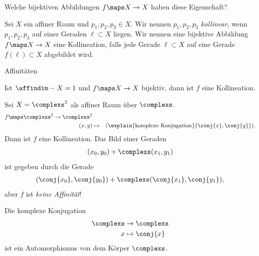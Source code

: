 \begin{frage*}
    Welche bijektiven Abbildungen \( f\maps X\to X \) haben diese Eigenschaft?
\end{frage*}
\begin{definition*}
    Sei \( X \) ein affiner Raum und \( p_1,p_2,p_3\in X \). Wir nennen \( p_1,p_2,p_3 \) \emph{kollinear}, wenn \( p_1,p_2,p_3 \) auf einer Geraden \( \ell \subset X \) liegen. Wir nennen eine bijektive Abbildung \( f\maps X\to X \) eine Kollineation, falls jede Gerade \( \ell \subset X \) auf eine Gerade \( f(\ell)\subset X \) abgebildet wird.
\end{definition*}
\begin{beispiel}
    Affinitäten
\end{beispiel}
\begin{beispiel}
    Ist \( \affindim-{X}=1 \) und \( f\maps X\to X \) bijektiv, dann ist \( f \) eine Kollineation.
\end{beispiel}
\begin{beispiel}\label{kollinieationen:beispiele:komplexe_konjugation}
    Sei \( X=\complexs^2 \) als affiner Raum über \( \complexs \).
    \begin{align*}
        f\maps \begin{aligned}[t]
            \complexs^2\to \complexs^2\\
            (x,y)&\mapsto &(\explain{\text{komplexe Konjugation}}{\conj{x},\conj{y          }}).
        \end{aligned}
    \end{align*}
    Dann ist \( f \) eine Kollineation. Das Bild einer Geraden
    \begin{align*}
        (x_0,y_0)+\complexs(x_1,y_1)
    \end{align*}
    ist gegeben durch die Gerade
    \begin{align*}
        (\conj{x_0},\conj{y_0})+\complexs(\conj{x_1},\conj{y_1}),
    \end{align*}
    aber \( f \) ist \emph{keine Affinität}!
\end{beispiel}
\begin{bemerkung*}
    Die komplexe Konjugation
    \begin{align*}
        \begin{aligned}[t]
            \complexs&\to \complexs\\
            x&\mapsto \conj{x}
        \end{aligned}
    \end{align*}
    ist ein Automorphismus von dem Körper \( \complexs \).
\end{bemerkung*}